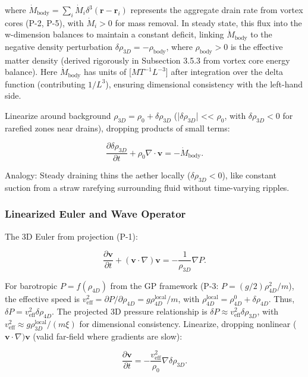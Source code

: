 where $\dot{M}_{\text{body}} = \sum_i \dot{M}_i \delta^3(\mathbf{r} - \mathbf{r}_i)$ represents the aggregate drain rate from vortex cores (P-2, P-5), with $\dot{M}_i > 0$ for mass removal. In steady state, this flux into the w-dimension balances to maintain a constant deficit, linking $\dot{M}_{\text{body}}$ to the negative density perturbation $\delta \rho_{3D} = -\rho_{\text{body}}$, where $\rho_{\text{body}} > 0$ is the effective matter density (derived rigorously in Subsection 3.5.3 from vortex core energy balance). Here $\dot{M}_{\text{body}}$ has units of [$M T^{-1} L^{-3}$] after integration over the delta function (contributing $1/L^3$), ensuring dimensional consistency with the left-hand side.

Linearize around background $\rho_{3D} = \rho_0 + \delta \rho_{3D}$ (|$ \delta \rho_{3D} $| << $\rho_0$, with $\delta \rho_{3D} < 0$ for rarefied zones near drains), dropping products of small terms:

\[
\frac{\partial \delta \rho_{3D}}{\partial t} + \rho_0 \nabla \cdot \mathbf{v} = -\dot{M}_{\text{body}}.
\]

Analogy: Steady draining thins the aether locally ($\delta \rho_{3D} < 0$), like constant suction from a straw rarefying surrounding fluid without time-varying ripples.

\subsubsection{Linearized Euler and Wave Operator}

The 3D Euler from projection (P-1):

\[
\frac{\partial \mathbf{v}}{\partial t} + (\mathbf{v} \cdot \nabla) \mathbf{v} = -\frac{1}{\rho_{3D}} \nabla P.
\]

For barotropic $P = f(\rho_{4D})$ from the GP framework (P-3: $P = (g/2) \rho_{4D}^2 / m$), the effective speed is $v_{\text{eff}}^2 = \partial P / \partial \rho_{4D} = g \rho_{4D}^{\text{local}} / m$, with $\rho_{4D}^{\text{local}} = \rho_{4D}^0 + \delta \rho_{4D}$. Thus, $\delta P = v_{\text{eff}}^2 \delta \rho_{4D}$. The projected 3D pressure relationship is $\delta P \approx v_{\text{eff}}^2 \delta \rho_{3D}$, with $v_{\text{eff}}^2 \approx g \rho_{3D}^{\text{local}} / (m \xi)$ for dimensional consistency. Linearize, dropping nonlinear ($\mathbf{v} \cdot \nabla) \mathbf{v}$ (valid far-field where gradients are slow):

\[
\frac{\partial \mathbf{v}}{\partial t} = -\frac{v_{\text{eff}}^2}{\rho_0} \nabla \delta \rho_{3D}.
\]

